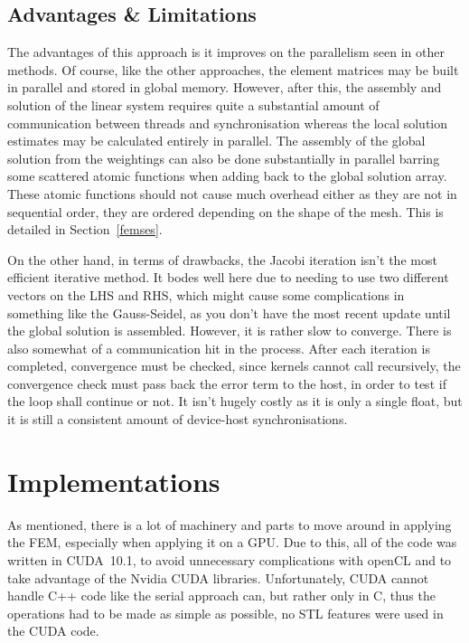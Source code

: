 \subsection{Advantages \& Limitations}

The advantages of this approach is it improves on the parallelism seen in other methods. Of course, like the other approaches, the element matrices may be built in parallel and stored in global memory. However, after this, the assembly and solution of the linear system requires quite a substantial amount of communication between threads and synchronisation whereas the local solution estimates may be calculated entirely in parallel. The assembly of the global solution from the weightings can also be done substantially in parallel barring some scattered atomic functions when adding back to the global solution array. These atomic functions should not cause much overhead either as they are not in sequential order, they are ordered depending on the shape of the mesh. This is detailed in Section~\ref{femses}.

On the other hand, in terms of drawbacks, the Jacobi iteration isn't the most efficient iterative method. It bodes well here due to needing to use two different vectors on the LHS and RHS, which might cause some complications in something like the Gauss-Seidel, as you don't have the most recent update until the global solution is assembled. However, it is rather slow to converge. There is also somewhat of a communication hit in the process. After each iteration is completed, convergence must be checked, since kernels cannot call recursively, the convergence check must pass back the error term to the host, in order to test if the loop shall continue or not. It isn't hugely costly as it is only a single float, but it is still a consistent amount of device-host synchronisations.

\section{Implementations}\label{gpucode}

As mentioned, there is a lot of machinery and parts to move around in applying the FEM, especially when applying it on a GPU. Due to this, all of the code was written in CUDA~10.1, to avoid unnecessary complications with openCL and to take advantage of the Nvidia CUDA libraries. Unfortunately, CUDA cannot handle C++ code like the serial approach can, but rather only in C, thus the operations had to be made as simple as possible, no STL features were used in the CUDA code. 

